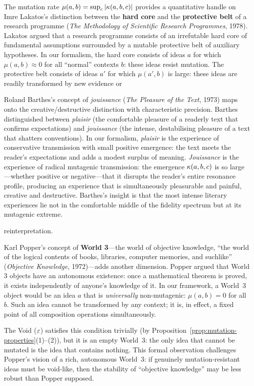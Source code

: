 \begin{interpretation}
\label{interp:ch9:lakatos_popper}
The mutation rate $\mu(a, b) = \sup_c |\kappa(a, b, c)|$ provides a
quantitative handle on Imre Lakatos's distinction between the
\textbf{hard core} and the \textbf{protective belt} of a research programme
(\emph{The Methodology of Scientific Research Programmes}, 1978).  Lakatos
argued that a research programme consists of an irrefutable hard core of
fundamental assumptions surrounded by a mutable protective belt of auxiliary
hypotheses.  In our formalism, the hard core consists of ideas $a$ for which
$\mu(a, b) \approx 0$ for all ``normal'' contexts $b$: these ideas resist
mutation.  The protective belt consists of ideas $a'$ for which $\mu(a', b)$
is large: these ideas are readily transformed by new evidence or

\begin{remark}
\label{rem:ch9:jouissance}
Roland Barthes's concept of \emph{jouissance} (\emph{The Pleasure of the
Text}, 1973) maps onto the creative/destructive distinction with
characteristic precision.  Barthes distinguished between \emph{plaisir}
(the comfortable pleasure of a readerly text that confirms expectations)
and \emph{jouissance} (the intense, destabilising pleasure of a text that
shatters conventions).  In our formalism, \emph{plaisir} is the experience
of conservative transmission with small positive emergence: the text meets
the reader's expectations and adds a modest surplus of meaning.
\emph{Jouissance} is the experience of radical mutagenic transmission:
the emergence $\kappa(a, b, c)$ is so large---whether positive or
negative---that it disrupts the reader's entire resonance profile, producing
an experience that is simultaneously pleasurable and painful, creative and
destructive.  Barthes's insight is that the most intense literary experiences
lie not in the comfortable middle of the fidelity spectrum but at its
mutagenic extreme.
\end{remark}


reinterpretation.

Karl Popper's concept of \textbf{World 3}---the world of objective knowledge,
``the world of the logical contents of books, libraries, computer memories,
and suchlike'' (\emph{Objective Knowledge}, 1972)---adds another dimension.
Popper argued that World 3 objects have an autonomous existence: once a
mathematical theorem is proved, it exists independently of anyone's
knowledge of it.  In our framework, a World~3 object would be an idea $a$
that is \emph{universally} non-mutagenic: $\mu(a, b) = 0$ for all $b$.
Such an idea cannot be transformed by any context; it is, in effect, a
fixed point of all composition operations simultaneously.

The Void ($\varepsilon$) satisfies this condition trivially (by
Proposition~\ref{prop:mutation-properties}(1)--(2)), but it is an empty
World~3: the only idea that cannot be mutated is the idea that contains
nothing.  This formal observation challenges Popper's vision of a rich,
autonomous World~3: if genuinely mutation-resistant ideas must be void-like,
then the stability of ``objective knowledge'' may be less robust than Popper
supposed.
\end{interpretation}



